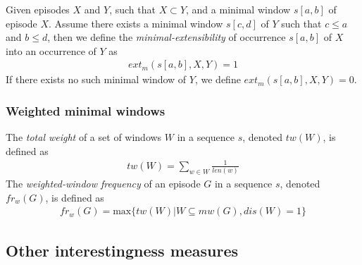 \begin{definition}
Given episodes $ X $ and $ Y $, such that $ X \subset Y $, and a minimal window $ s[a, b] $ of episode $ X $. Assume there exists a minimal window $ s[c, d] $ of $ Y $ such that $ c \leq a $ and $ b \leq d $, then we define the \emph{minimal-extensibility} of occurrence $ s[a, b] $ of $ X $ into an occurrence of $ Y $ as
\begin{align*}
ext_m(s[a, b], X, Y) = 1
\end{align*}
If there exists no such minimal window of $ Y $, we define $ ext_m(s[a, b], X, Y) = 0 $.
\end{definition}

\subsubsection{Weighted minimal windows}

\begin{definition}
The \emph{total weight} of a set of windows $ W $ in a sequence $ s $, denoted $ tw(W) $, is defined as
\begin{align*}
tw(W) = \sum_{w \in W}{\frac{1}{len(w)}}
\end{align*}
The \emph{weighted-window frequency} of an episode $ G $ in a sequence $ s $, denoted $ fr_w(G) $, is defined as
\begin{align*}
fr_w(G) = \text{max} \{ tw(W) | W \subseteq mw(G), dis(W) = 1 \}
\end{align*}
\end{definition}

\subsection{Other interestingness measures}

